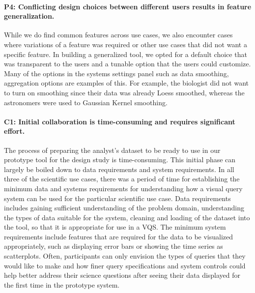 {\paragraph{P4: Conflicting design choices between different users results in feature generalization.}
While we do find common features across use cases, we also encounter cases where variations of a feature was required or other use cases that did not want a specific feature. In building a generalized tool, we opted for a default choice that was transparent to the users and a tunable option that the users could customize. Many of the options in the systems settings panel such as data smoothing, aggregation options are examples of this. For example, the biologist did not want to turn on smoothing since their data was already Loess smoothed, whereas the astronomers were used to Gaussian Kernel smoothing. 
\paragraph{C1: Initial collaboration is time-consuming and requires significant effort.} 
The process of preparing the analyst's dataset to be ready to use in our prototype tool for the design study is time-consuming. This initial phase can largely be boiled down to data requirements and system requirements. In all three of the scientific use cases, there was a period of time for establishing the minimum data and systems requirements for understanding how a visual query system can be used for the particular scientific use case. Data requirements includes gaining sufficient understanding of the problem domain, understanding the types of data suitable for the system, cleaning and loading of the dataset into the tool, so that it is appropriate for use in a VQS. The minimum system requirements include features that are required for the data to be visualized appropriately, such as displaying error bars or showing the time series as scatterplots. Often, participants can only envision the types of queries that they would like to make and how finer query specifications and system controls could help better address their science questions after seeing their data displayed for the first time in the prototype system.
}
